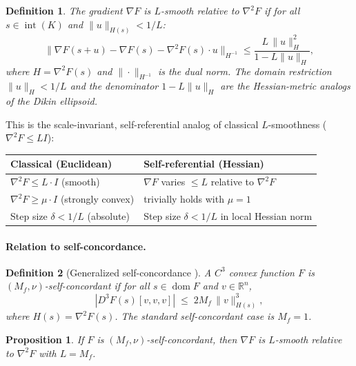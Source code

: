\documentclass[11pt]{article}
\newcommand{\R}{\mathbb{R}}
\newtheorem{definition}{Definition}
\newtheorem{proposition}{Proposition}
\begin{document}
\begin{definition}\label{def:rel-smooth}
The gradient $\nabla F$ is \emph{$L$-smooth relative to $\nabla^2 F$}
if for all $s \in \operatorname{int}(K)$ and $\|u\|_{H(s)} < 1/L$:
\begin{equation}\label{eq:rel-smooth}
  \|\nabla F(s + u) - \nabla F(s) - \nabla^2 F(s) \cdot u\|_{H^{-1}}
  \leq \frac{L \, \|u\|_H^2}{1 - L\|u\|_H},
\end{equation}
where $H = \nabla^2 F(s)$ and $\|\cdot\|_{H^{-1}}$ is the dual norm.
The domain restriction $\|u\|_H < 1/L$ and the denominator
$1 - L\|u\|_H$ are the Hessian-metric analogs of the Dikin ellipsoid.
\end{definition}

This is the scale-invariant, self-referential analog of classical
$L$-smoothness ($\nabla^2 F \leq LI$):
\begin{center}
\begin{tabular}{@{}ll@{}}
\toprule
\textbf{Classical (Euclidean)} & \textbf{Self-referential (Hessian)} \\
\midrule
$\nabla^2 F \leq L \cdot I$ (smooth) &
  $\nabla F$ varies $\leq L$ relative to $\nabla^2 F$ \\
$\nabla^2 F \geq \mu \cdot I$ (strongly convex) &
  trivially holds with $\mu = 1$ \\
Step size $\delta < 1/L$ (absolute) &
  Step size $\delta < 1/L$ in local Hessian norm \\
\bottomrule
\end{tabular}
\end{center}

\paragraph{Relation to self-concordance.}

\begin{definition}[Generalized self-concordance {\cite[Def.~5.1.1]{nesterov2004}}]
A $C^3$ convex function $F$ is \emph{$(M_f, \nu)$-self-concordant} if
for all $s \in \operatorname{dom} F$ and $v \in \R^n$,
\begin{equation}\label{eq:gsc}
  |D^3 F(s)[v,v,v]| \;\leq\; 2M_f \,\|v\|_{H(s)}^3,
\end{equation}
where $H(s) = \nabla^2 F(s)$.  The standard self-concordant case is
$M_f = 1$.
\end{definition}

\begin{proposition}\label{prop:sc-implies-rs}
If $F$ is $(M_f, \nu)$-self-concordant, then $\nabla F$ is
$L$-smooth relative to $\nabla^2 F$ with $L = M_f$.
\end{proposition}
\end{document}

